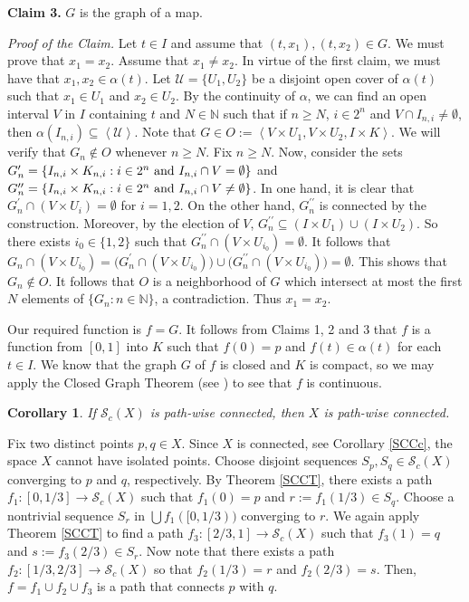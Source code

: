 \documentclass[11pt]{amsart}
\numberwithin{equation}{section}
\theoremstyle{plain}
\newtheorem{corollary}[equation]{Corollary}
\theoremstyle{definition}
\theoremstyle{definition}
\theoremstyle{definition}
\theoremstyle{definition}
\theoremstyle{definition}
\begin{document}
\textbf{Claim 3.} $G$ is the graph of a map.\medskip

\textit{Proof of the Claim.} Let $t \in I$ and assume that $(t,x_1), (t,x_2) \in G$. We must prove that $x_1 = x_2$. Assume that $x_1 \not= x_2$. In virtue of the first claim, we must have that $x_1,x_2 \in \alpha(t)$. Let $\mathcal{U} = \{U_1,U_2\}$ be a disjoint open cover of $\alpha(t)$ such that $x_1 \in U_1$ and $x_2 \in U_2$. By the continuity of $\alpha$, we can find an open interval $V$ in $I$ containing $t$ and $N \in {\mathbb N}$ such that if $n \geq N$, $i \in 2^n$ and $V \cap I_{n,i} \not= \emptyset$, then $\alpha(I_{n,i}) \subseteq \left\langle \mathcal{U} \right\rangle$. Note that $G \in O := \left\langle V \times U_1 ,V \times U_2, I \times K\right\rangle$. We will verify that $G_n \not \in O$ whenever $n \geq N$. Fix $n \geq N$. Now, consider the sets $G_n^\prime = \{ I_{n,i} \times K_{n,i} : i \in 2^n  \textnormal{ and } I_{n,i} \cap V = \emptyset\}$ and $G_n^{\prime\prime} = \{ I_{n,i} \times K_{n,i} : i \in 2^n  \textnormal{ and } I_{n,i} \cap V \not= \emptyset\}$. In one hand, it is clear that $G_n^\prime \cap (V \times U_i) = \emptyset$ for $i = 1,2$. On the other hand, $G_n^{\prime\prime}$ is connected by the construction. Moreover, by the election of $V$, $G_n^{\prime\prime} \subseteq (I \times U_1) \cup (I \times U_2)$. So there exists $i_0 \in \{1,2\}$ such that $G_n^{\prime\prime} \cap (V \times U_{i_0}) = \emptyset$. It follows that $G_n \cap (V \times U_{i_0}) = \big(G_n^{\prime} \cap (V \times U_{i_0})\big) \cup \big(G_n^{\prime\prime} \cap (V \times U_{i_0})\big) = \emptyset$. This shows that $G_n \not \in O$. It follows that $O$ is  a neighborhood of $G$ which intersect at most the first $N$ elements of $\{G_n : n \in {\mathbb N}\}$, a contradiction. Thus $x_1 = x_2$.

\medskip

Our required function is $f = G$. It follows from Claims 1, 2 and 3 that $f$ is a function from $[0,1]$ into $K$ such that $f(0) = p$ and $f(t) \in \alpha(t)$ for each $t \in I$. We know that the graph $G$ of $f$ is closed and $K$ is compact, so we may apply the Closed Graph Theorem (see \cite[Ex. 3.1.D (a)]{eng}) to see that $f$ is continuous.
\endproof

\begin{corollary}
If $\mathcal{S}_c(X)$ is path-wise connected, then $X$ is path-wise connected.
\end{corollary}

\proof
Fix two distinct points $p, q \in X$.  Since $X$ is connected, see  Corollary \ref{SCCc}, the space $X$ cannot have isolated points. Choose disjoint sequences $S_p,S_q \in \mathcal{S}_c(X)$ converging to $p$ and $q$, respectively. By Theorem \ref{SCCT}, there exists a path $f_1 : [0,1/3] \to \mathcal{S}_c(X)$ such that $f_1(0) = p$ and $r := f_1(1/3) \in S_q$. Choose a nontrivial sequence $S_r$ in $\bigcup f_1([0,1/3))$ converging to $r$. We again apply Theorem  \ref{SCCT} to find a path $f_3 : [2/3,1] \to \mathcal{S}_c(X)$ such that $f_3(1) = q$ and $s := f_3(2/3) \in S_r$. Now note that there exists a path $f_2 : [1/3,2/3] \to \mathcal{S}_c(X)$ so that $f_2(1/3) = r$ and $f_2(2/3) = s$. Then, $f = f_1 \cup f_2 \cup f_3$ is a path that connects  $p$  with $q$.
\endproof
\end{document}
